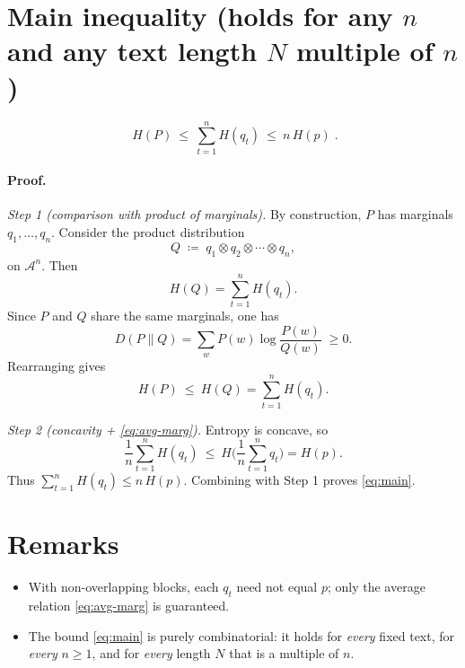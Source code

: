\documentclass[11pt]{article}
\begin{document}
\section*{Main inequality (holds for any $n$ and any text length $N$ multiple of $n$)}
\begin{equation}
\label{eq:main}
\boxed{\; H(P)\ \le\ \sum_{t=1}^{n} H(q_t)\ \le\ n\,H(p)\; }.
\end{equation}

\paragraph{Proof.}
\emph{Step 1 (comparison with product of marginals).}
By construction, $P$ has marginals $q_1,\dots,q_n$. Consider the product distribution
\[
Q\;\coloneqq\; q_1\otimes q_2\otimes\cdots\otimes q_n,
\]
on $\mathcal A^n$. Then
\[
H(Q)=\sum_{t=1}^n H(q_t).
\]
Since $P$ and $Q$ share the same marginals, one has
\[
D(P\|Q)=\sum_{w} P(w)\log\frac{P(w)}{Q(w)}\;\ge 0.
\]
Rearranging gives
\[
H(P)\ \le\ H(Q)=\sum_{t=1}^n H(q_t).
\]

\smallskip
\emph{Step 2 (concavity + \eqref{eq:avg-marg}).} Entropy is concave, so
\[
\frac{1}{n}\sum_{t=1}^{n} H(q_t)\ \le\ H\!\Big(\frac{1}{n}\sum_{t=1}^{n}q_t\Big)
= H(p).
\]
Thus $\sum_{t=1}^{n} H(q_t)\le n\,H(p)$. Combining with Step 1 proves \eqref{eq:main}.

\section*{Remarks}
\begin{itemize}
  \item With non-overlapping blocks, each $q_t$ need not equal $p$; only the average relation \eqref{eq:avg-marg} is guaranteed.
  \item The bound \eqref{eq:main} is purely combinatorial: it holds for \emph{every} fixed text, for \emph{every} $n\ge1$, and for \emph{every} length $N$ that is a multiple of $n$.
\end{itemize}
\end{document}
